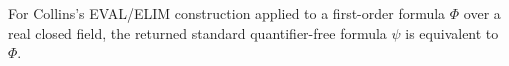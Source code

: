 For Collins's EVAL/ELIM construction applied to a first-order formula \(\Phi\) over a real closed field, the returned standard quantifier-free formula \(\psi\) is equivalent to \(\Phi\).